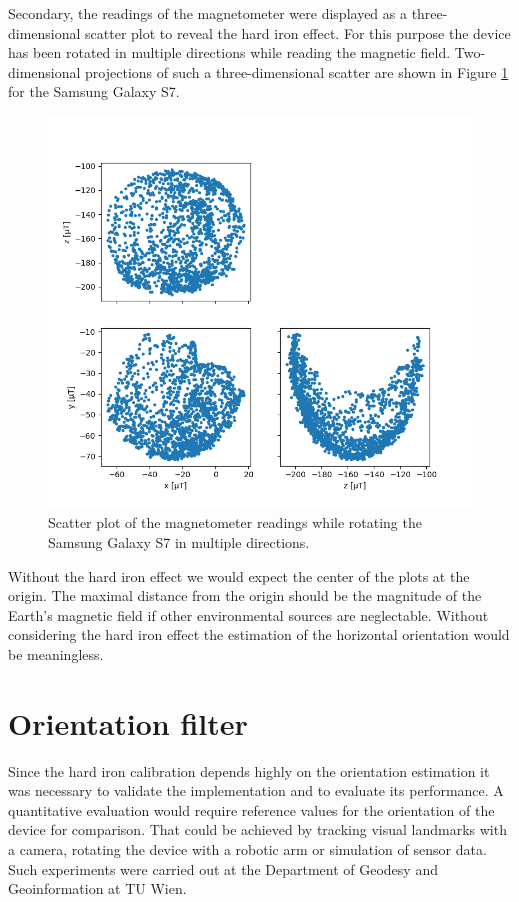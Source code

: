 Secondary, the readings of the magnetometer were displayed as a three-dimensional scatter plot to reveal the hard iron effect. For this purpose the device has been rotated in multiple directions while reading the magnetic field. Two-dimensional projections of such a three-dimensional scatter are shown in Figure \ref{fig:scatter} for the Samsung Galaxy S7.

\begin{figure}[hbt!]
    \centering
    \includegraphics[width=1.0\textwidth]{figures/scatter_s7.png}
    \caption{Scatter plot of the magnetometer readings while rotating the Samsung Galaxy S7 in multiple directions.}
    \label{fig:scatter}
\end{figure}

Without the hard iron effect we would expect the center of the plots at the origin. The maximal distance from the origin should be the magnitude of the Earth's magnetic field if other environmental sources are neglectable. Without considering the hard iron effect the estimation of the horizontal orientation would be meaningless.

\section{Orientation filter}

Since the hard iron calibration depends highly on the orientation estimation it was necessary to validate the implementation and to evaluate its performance. A quantitative evaluation would require reference values for the orientation of the device for comparison. That could be achieved by tracking visual landmarks with a camera, rotating the device with a robotic arm or simulation of sensor data. Such experiments were carried out at the Department of Geodesy and Geoinformation at TU Wien.\cite{Ettlinger2018}

